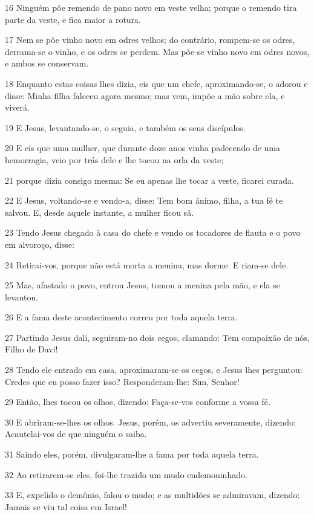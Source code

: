 \par 16 Ninguém põe remendo de pano novo em veste velha; porque o remendo tira parte da veste, e fica maior a rotura.
\par 17 Nem se põe vinho novo em odres velhos; do contrário, rompem-se os odres, derrama-se o vinho, e os odres se perdem. Mas põe-se vinho novo em odres novos, e ambos se conservam.
\par 18 Enquanto estas coisas lhes dizia, eis que um chefe, aproximando-se, o adorou e disse: Minha filha faleceu agora mesmo; mas vem, impõe a mão sobre ela, e viverá.
\par 19 E Jesus, levantando-se, o seguia, e também os seus discípulos.
\par 20 E eis que uma mulher, que durante doze anos vinha padecendo de uma hemorragia, veio por trás dele e lhe tocou na orla da veste;
\par 21 porque dizia consigo mesma: Se eu apenas lhe tocar a veste, ficarei curada.
\par 22 E Jesus, voltando-se e vendo-a, disse: Tem bom ânimo, filha, a tua fé te salvou. E, desde aquele instante, a mulher ficou sã.
\par 23 Tendo Jesus chegado à casa do chefe e vendo os tocadores de flauta e o povo em alvoroço, disse:
\par 24 Retirai-vos, porque não está morta a menina, mas dorme. E riam-se dele.
\par 25 Mas, afastado o povo, entrou Jesus, tomou a menina pela mão, e ela se levantou.
\par 26 E a fama deste acontecimento correu por toda aquela terra.
\par 27 Partindo Jesus dali, seguiram-no dois cegos, clamando: Tem compaixão de nós, Filho de Davi!
\par 28 Tendo ele entrado em casa, aproximaram-se os cegos, e Jesus lhes perguntou: Credes que eu posso fazer isso? Responderam-lhe: Sim, Senhor!
\par 29 Então, lhes tocou os olhos, dizendo: Faça-se-vos conforme a vossa fé.
\par 30 E abriram-se-lhes os olhos. Jesus, porém, os advertiu severamente, dizendo: Acautelai-vos de que ninguém o saiba.
\par 31 Saindo eles, porém, divulgaram-lhe a fama por toda aquela terra.
\par 32 Ao retirarem-se eles, foi-lhe trazido um mudo endemoninhado.
\par 33 E, expelido o demônio, falou o mudo; e as multidões se admiravam, dizendo: Jamais se viu tal coisa em Israel!
